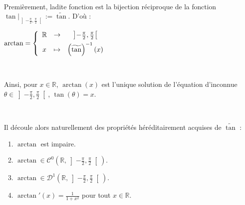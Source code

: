 \documentclass{article}
\begin{document}
\

Premièrement, ladite fonction est la bijection réciproque de la fonction $\tan |_{\left] -\frac{\pi}{2}, \frac{\pi}{2}\right[ }:=\widetilde{\tan}$. D'où : 
\begin{center}

$\arctan = \left\{  
\begin{array}{c c c}
\mathbb{R} & \to & \left] -\frac{\pi}{2}, \frac{\pi}{2}\right[ \\ [1ex]
x & \mapsto & \left( \widetilde{\tan} \right)^{-1}(x)
\end{array} 
\right.
$
\end{center}

\

Ainsi, pour $x\in \mathbb{R}$, $\arctan (x)$ est l'unique solution de l'équation d'inconnue $\theta \in \textstyle \left] -\frac{\pi}{2}, \frac{\pi}{2}\right[$, $\tan(\theta) = x$. 

\

Il découle alors naturellement des propriétés héréditairement acquises de $\widetilde{\tan}$ : 

\begin{enumerate}
    \item $\arctan$ est impaire.
    \item $\arctan \in \mathcal{C}^0\left(\mathbb{R},\left] -\frac{\pi}{2}, \frac{\pi}{2}\right[ \right)$.
    \item $\arctan \in \mathcal{D}^1\left(\mathbb{R},\left] -\frac{\pi}{2}, \frac{\pi}{2}\right[ \right)$.
    \item $\arctan'(x) = \frac{1}{1+x^2}$ pour tout $x\in\mathbb{R}$.
\end{enumerate}

\newpage
\end{document}

